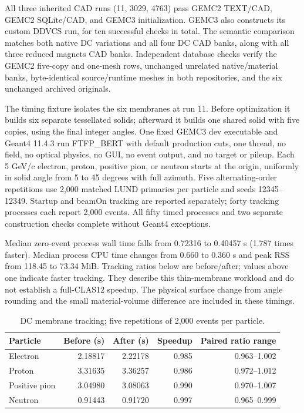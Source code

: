 All three inherited CAD runs (11, 3029, 4763) pass GEMC2 TEXT/CAD, GEMC2 SQLite/CAD, and GEMC3 initialization.
GEMC3 also constructs its custom DDVCS run, for ten successful checks in total. The semantic comparison
matches both native DC variations and all four DC CAD banks, along with all three reduced magnets CAD banks.
Independent database checks verify the GEMC2 five-copy and one-mesh rows, unchanged unrelated native/material
banks, byte-identical source/runtime meshes in both repositories, and the six unchanged archived originals.

The timing fixture isolates the six membranes at run 11. Before optimization it builds six separate
tessellated solids; afterward it builds one shared solid with five copies, using the final integer angles. One
fixed GEMC3 dev executable and Geant4 11.4.3 run FTFP\_BERT with default production cuts, one thread, no
field, no optical physics, no GUI, no event output, and no target or pileup. Each 5 GeV/c electron, proton,
positive pion, or neutron starts at the origin, uniformly in solid angle from 5 to 45 degrees with full
azimuth. Five alternating-order repetitions use 2,000 matched LUND primaries per particle and seeds
12345--12349. Startup and beamOn tracking are reported separately; forty tracking processes each report 2,000
events. All fifty timed processes and two separate construction checks complete without Geant4 exceptions.

Median zero-event process wall time falls from 0.72316 to 0.40457 s (1.787 times faster). Median process CPU
time changes from 0.660 to 0.360 s and peak RSS from 118.45 to 73.34 MiB. Tracking ratios below are
before/after; values above one indicate faster tracking. They describe this thin-membrane workload and do not
establish a full-CLAS12 speedup. The physical surface change from angle rounding and the small material-volume
difference are included in these timings.

\begin{table}[htbp]
\centering
\setlength{\tabcolsep}{8pt}
\caption{DC membrane tracking; five repetitions of 2,000 events per particle.}
\label{tab:dc-back}
\begin{tabular}{lrrrr}
\toprule
Particle & Before (s) & After (s) & Speedup & Paired ratio range \\
\midrule
Electron & 2.18817 & 2.22178 & 0.985 & 0.963--1.002 \\
Proton & 3.31635 & 3.36257 & 0.986 & 0.972--1.012 \\
Positive pion & 3.04980 & 3.08063 & 0.990 & 0.970--1.007 \\
Neutron & 0.91443 & 0.91720 & 0.997 & 0.965--0.999 \\
\bottomrule
\end{tabular}
\end{table}

